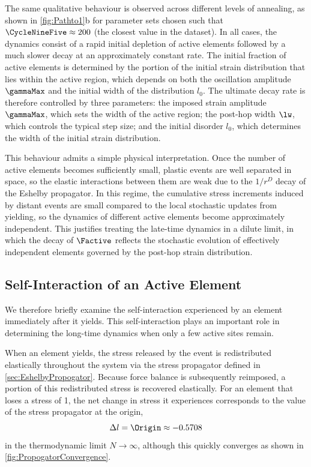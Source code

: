 \documentclass[asymmetricmargins]{library/duthesis}%
\begin{document}
The same qualitative behaviour is observed across different levels of annealing, as shown in \cref{fig:Pathto1}b for parameter sets chosen such that $\CycleNineFive \approx 200$ (the closest value in the dataset). In all cases, the dynamics consist of a rapid initial depletion of active elements followed by a much slower decay at an approximately constant rate. The initial fraction of active elements is determined by the portion of the initial strain distribution that lies within the active region, which depends on both the oscillation amplitude $\gammaMax$ and the initial width of the distribution $l_0$. The ultimate decay rate is therefore controlled by three parameters: the imposed strain amplitude $\gammaMax$, which sets the width of the active region; the post-hop width $\lw$, which controls the typical step size; and the initial disorder $l_0$, which determines the width of the initial strain distribution.

This behaviour admits a simple physical interpretation. Once the number of active elements becomes sufficiently small, plastic events are well separated in space, so the elastic interactions between them are weak due to the $1/r^D$ decay of the Eshelby propagator. In this regime, the cumulative stress increments induced by distant events are small compared to the local stochastic updates from yielding, so the dynamics of different active elements become approximately independent. This justifies treating the late-time dynamics in a dilute limit, in which the decay of $\Factive$ reflects the stochastic evolution of effectively independent elements governed by the post-hop strain distribution.

\subsection*{Self-Interaction of an Active Element}

We therefore briefly examine the self-interaction experienced by an element immediately after it yields. This self-interaction plays an important role in determining the long-time dynamics when only a few active sites remain.

When an element yields, the stress released by the event is redistributed elastically throughout the system via the stress propagator defined in \cref{sec:EshelbyPropogator}. Because force balance is subsequently reimposed, a portion of this redistributed stress is recovered elastically. For an element that loses a stress of 1, the net change in stress it experiences corresponds to the value of the stress propagator at the origin, 
\[
\Delta l = \Origin \approx -0.5708 
\]
in the thermodynamic limit $N\to\infty$, although this quickly converges as shown in \cref{fig:PropogatorConvergence}.
\end{document}
